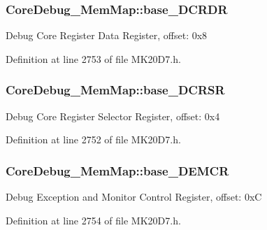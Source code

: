 \subsubsection[{\texorpdfstring{base\+\_\+\+D\+C\+R\+DR}{base_DCRDR}}]{ Core\+Debug\+\_\+\+Mem\+Map\+::base\+\_\+\+D\+C\+R\+DR}\hypertarget{struct_core_debug___mem_map_aac76a717b2aba2ccbf75e020cc71fb3e}{}\label{struct_core_debug___mem_map_aac76a717b2aba2ccbf75e020cc71fb3e}
Debug Core Register Data Register, offset\+: 0x8 

Definition at line 2753 of file M\+K20\+D7.\+h.

\subsubsection[{\texorpdfstring{base\+\_\+\+D\+C\+R\+SR}{base_DCRSR}}]{ Core\+Debug\+\_\+\+Mem\+Map\+::base\+\_\+\+D\+C\+R\+SR}\hypertarget{struct_core_debug___mem_map_ad9c98f7390e5d3a6b54df56ddea32e8b}{}\label{struct_core_debug___mem_map_ad9c98f7390e5d3a6b54df56ddea32e8b}
Debug Core Register Selector Register, offset\+: 0x4 

Definition at line 2752 of file M\+K20\+D7.\+h.

\subsubsection[{\texorpdfstring{base\+\_\+\+D\+E\+M\+CR}{base_DEMCR}}]{ Core\+Debug\+\_\+\+Mem\+Map\+::base\+\_\+\+D\+E\+M\+CR}\hypertarget{struct_core_debug___mem_map_a13a099e668fcb3587b2cd6eb8f8608d5}{}\label{struct_core_debug___mem_map_a13a099e668fcb3587b2cd6eb8f8608d5}
Debug Exception and Monitor Control Register, offset\+: 0xC 

Definition at line 2754 of file M\+K20\+D7.\+h.

